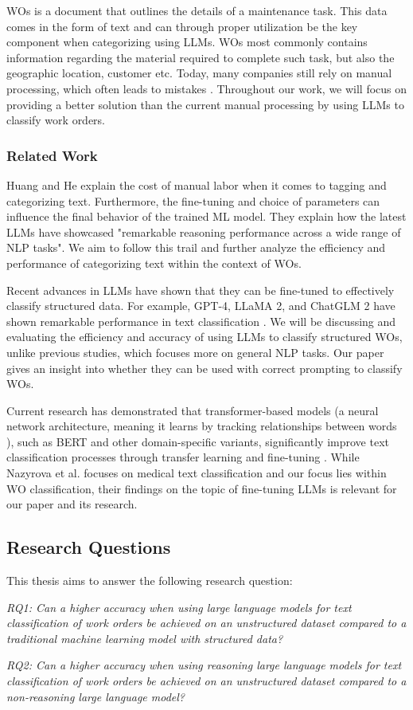WOs is a document that outlines the details of a maintenance task. This data
comes in the form of text and can through proper utilization be the key
component when categorizing using LLMs. WOs most commonly contains information regarding
the material required to complete such task, but also the geographic location, customer
etc. Today, many companies still rely on manual processing, which often leads to
mistakes \cite{ibm2023} \cite{li2024}. Throughout our work, we will focus on
providing a better solution than the current manual processing by using LLMs to
classify work orders.

\subsubsection{Related Work}

Huang and He \cite{huang2024} explain the cost of manual labor when it comes to tagging
and categorizing text. Furthermore, the fine-tuning and choice of parameters can
influence the final behavior of the trained ML model. They explain how the
latest LLMs have showcased "remarkable reasoning performance across a wide range
of NLP tasks". We aim to follow this trail and further analyze the efficiency and
performance of categorizing text within the context of WOs.

\bigskip
Recent advances in LLMs have shown that they can be fine-tuned to effectively classify
structured data. For example, GPT-4, LLaMA 2, and ChatGLM 2 have shown remarkable
performance in text classification \cite{zhang2024}. We will be discussing and
evaluating the efficiency and accuracy of using LLMs to classify structured WOs,
unlike previous studies, which focuses more on general NLP tasks. Our paper gives
an insight into whether they can be used with correct prompting to classify WOs.

\bigskip
Current research has demonstrated that transformer-based models (a neural
network architecture, meaning it learns by tracking relationships between words \cite{merritt2022}),
such as BERT and other domain-specific variants, significantly improve text
classification processes through transfer learning and fine-tuning
\cite{nazyrova2024}. While Nazyrova et al. focuses on medical text
classification and our focus lies within WO classification, their findings on the
topic of fine-tuning LLMs is relevant for our paper and its research.

\subsection{Research Questions}

This thesis aims to answer the following research question:

\bigskip
\textit{RQ1: Can a higher accuracy when using large language models for text classification
of work orders be achieved on an unstructured dataset compared to a traditional machine
learning model with structured data?}

\bigskip
\textit{RQ2: Can a higher accuracy when using reasoning large language models for
text classification of work orders be achieved on an unstructured dataset compared
to a non-reasoning large language model?}